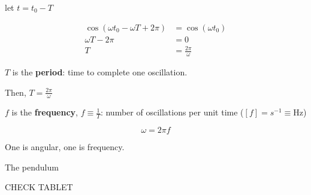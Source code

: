 let $t = t_0 - T$

\begin{align}
	\cos(\omega t_0 - \omega T + 2\pi) &= \cos(\omega t_0)\\
	\omega T - 2\pi &= 0\\
	T &= \frac{2\pi}{\omega}
\end{align}

$T$ is the \textbf{period}: time to complete one oscillation.

Then, $T = \frac{2\pi}{\omega}$

$f$ is the \textbf{frequency}, $f \equiv \frac{1}{T}$: number of oscillations per unit time ($[f] = s^{-1} \equiv \si{\Hz}$)

\begin{equation}
	\omega = 2\pi f
\end{equation}

One is angular, one is frequency.

\begin{example}
	The pendulum
\end{example}

\begin{sol}
	CHECK TABLET
\end{sol}
